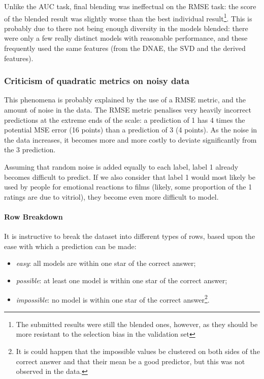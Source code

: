 \documentclass{article}
\begin{document}
Unlike the AUC task, final blending was ineffectual on the RMSE task: the score of the blended result was slightly worse than the best individual result\footnote{The submitted results were still the blended ones, however, as they should be more resistant to the selection bias in the validation set}.  This is probably due to there not being enough diversity in the models blended: there were only a few really distinct models with reasonable performance, and these frequently used the same features (from the DNAE, the SVD and the derived features).

\subsubsection{Criticism of quadratic metrics on noisy data}

This phenomena is probably explained by the use of a RMSE metric, and the amount of noise in the data.  The RMSE metric penalises very heavily incorrect predictions at the extreme ends of the scale: a prediction of 1 has 4 times the potential MSE error (16 points) than a prediction of 3 (4 points).  As the noise in the data increases, it becomes more and more costly to deviate significantly from the 3 prediction.

Assuming that random noise is added equally to each label, label 1 already becomes difficult to predict.  If we also consider that label 1 would most likely be used by people for emotional reactions to films (likely, some proportion of the 1 ratings are due to vitriol), they become even more difficult to model.

\paragraph{Row Breakdown}
It is instructive to break the dataset into different types of rows, based upon the ease with which a prediction can be made:
\begin{itemize}
\item \emph{easy}: all models are within one star of the correct answer;
\item \emph{possible}: at least one model is within one star of the correct answer;
\item \emph{impossible}: no model is within one star of the correct answer\footnote{It is could happen that the impossible values be clustered on both sides of the correct answer and that their mean be a good predictor, but this was not observed in the data.}.
\end{itemize}
\end{document}
